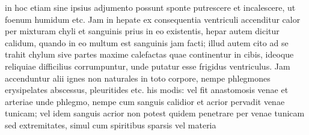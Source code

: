 in hoc 
etiam sine ipsius adjumento possunt sponte putrescere et incalescere, ut foenum humidum etc.%
Jam in hepate ex consequentia ventriculi accenditur calor per mixturam chyli et sanguinis prius in eo existentis, hepar autem dicitur
calidum, quando in eo multum est sanguinis jam facti; illud autem cito ad se trahit chylum sive partes maxime calefactas quae continentur in cibis, ideoque reliquiae difficilius corrumpuntur, unde putatur esse frigidus ventriculus. Jam accenduntur alii ignes non naturales in toto corpore, nempe phlegmones erysipelates abscessus, pleuritides etc. his modis: vel fit anastomosis venae et arteriae unde phlegmo, nempe cum sanguis calidior et acrior pervadit venae tunicam; vel idem sanguis acrior non potest quidem penetrare per venae tunicam sed extremitates, simul cum spiritibus sparsis
 vel materia%